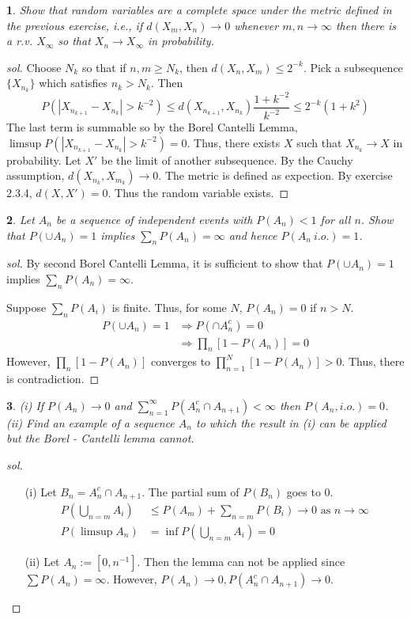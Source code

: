 \documentclass{report}
\newtheorem{ex}{}[section]
\begin{document}
\begin{ex}
Show that random variables are a complete space under the metric defined in the previous exercise, i.e., if $d(X_m, X_n) \to 0$ whenever $m,n \to \infty$ then there is a r.v. $X_\infty$ so that $X_n \to X_\infty$ in probability.
\end{ex}
\begin{proof}[sol]
Choose $N_k$ so that if $n,m \ge N_k$, then $d(X_n, X_m) \le 2^{-k}$. Pick a subsequence $\{X_{n_k}\}$ which satisfies $n_k > N_k$. Then
\[P(|X_{n_{k+1}} - X_{n_k}| > k^{-2}) \le d(X_{n_{k+1}}, X_{n_k}) \frac{1 + k^{-2}}{k^{-2}} \le 2^{-k}(1+ k^2)\]
The last term is summable so by the Borel Cantelli Lemma, $\limsup P(|X_{n_{k+1}} - X_{n_k}| > k^{-2}) = 0$. Thus, there exists $X$ such that $X_{n_k} \to X$ in probability. Let $X'$ be the limit of another subsequence. By the Cauchy assumption, $d(X_{n_k}, X_{m_k}) \to 0$. The metric is defined as expection. By exercise 2.3.4, $d(X, X') = 0$. Thus the random variable exists.
\end{proof}
\begin{ex}
Let $A_n$ be a sequence of independent events with $P(A_n) < 1$ for all $n$. Show that $P(\cup A_n) = 1$ implies $\sum_n P(A_n) = \infty$ and hence $P(A_n \ i.o.) = 1$.
\end{ex}
\begin{proof}[sol]
By second Borel Cantelli Lemma, it is sufficient to show that $P(\cup A_n) = 1$ implies $\sum_n P(A_n) = \infty$.

Suppose $\sum_n P(A_i)$ is finite. Thus, for some $N$, $P(A_n) = 0$ if $n > N$.
\begin{align*}
P(\cup A_n) = 1 &\Rightarrow P(\cap A_n^c) = 0\\
&\Rightarrow \prod_n [1 - P(A_n)] = 0
\end{align*}
However, $\prod_n [1 - P(A_n)] $ converges to $\prod^N_{n=1} [1 - P(A_n)] > 0$. Thus, there is contradiction.
\end{proof}
\begin{ex}
(i) If $P(A_n) \to 0$ and $\sum_{n = 1}^\infty P(A_n^c \cap A_{n+1}) < \infty$ then $P(A_n, i.o.) = 0$. (ii) Find an example of a sequence $A_n$ to which the result in (i) can be applied but the Borel - Cantelli lemma cannot.
\end{ex}
\begin{proof}[sol]
\begin{enumerate}
	\item[(i)] Let $B_n = A_n^c \cap A_{n+1}$. The partial sum of $P(B_n)$ goes to 0.
	\begin{align*}
	P(\bigcup_{n = m} A_i) &\le P(A_m) + \sum_{n = m} P(B_i) \to 0 \text{ as } n \to \infty\\
	P(\limsup A_n) &= \inf P(\bigcup_{n = m} A_i) = 0
	\end{align*}
	
	\item[(ii)]
	Let $A_n := [0, n^{-1}]$. Then the lemma can not be applied since $\sum P(A_n) = \infty$. However, $P(A_n) \to 0, P(A_n^c \cap A_{n+1}) \to 0$.
\end{enumerate}
\end{proof}
\end{document}
